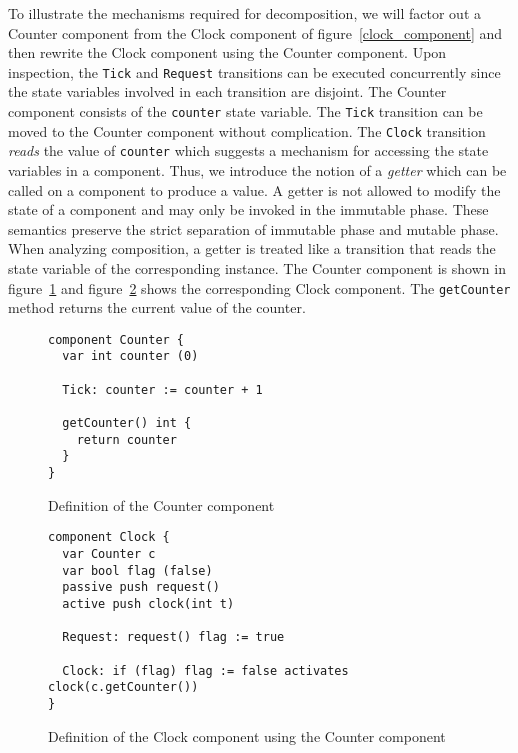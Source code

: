 To illustrate the mechanisms required for decomposition, we will factor out a Counter component from the Clock component of figure~\ref{clock_component} and then rewrite the Clock component using the Counter component.
Upon inspection, the \verb+Tick+ and \verb+Request+ transitions can be executed concurrently since the state variables involved in each transition are disjoint.
The Counter component consists of the \verb+counter+ state variable.
The \verb+Tick+ transition can be moved to the Counter component without complication.
The \verb+Clock+ transition \emph{reads} the value of \verb+counter+ which suggests a mechanism for accessing the state variables in a component.
Thus, we introduce the notion of a \emph{getter} which can be called on a component to produce a value.
A getter is not allowed to modify the state of a component and may only be invoked in the immutable phase.
These semantics preserve the strict separation of immutable phase and mutable phase.
When analyzing composition, a getter is treated like a transition that reads the state variable of the corresponding instance.
The Counter component is shown in figure~\ref{counter_component} and figure~\ref{factored_clock_component} shows the corresponding Clock component.
The \verb+getCounter+ method returns the current value of the counter.

\begin{figure}
\begin{verbatim}
component Counter {
  var int counter (0)

  Tick: counter := counter + 1

  getCounter() int {
    return counter
  }
}
\end{verbatim}
\caption{Definition of the Counter component\label{counter_component}}
\end{figure}

\begin{figure}
\begin{verbatim}
component Clock {
  var Counter c
  var bool flag (false)
  passive push request()
  active push clock(int t)

  Request: request() flag := true

  Clock: if (flag) flag := false activates clock(c.getCounter())
}
\end{verbatim}
\caption{Definition of the Clock component using the Counter component\label{factored_clock_component}}
\end{figure}

